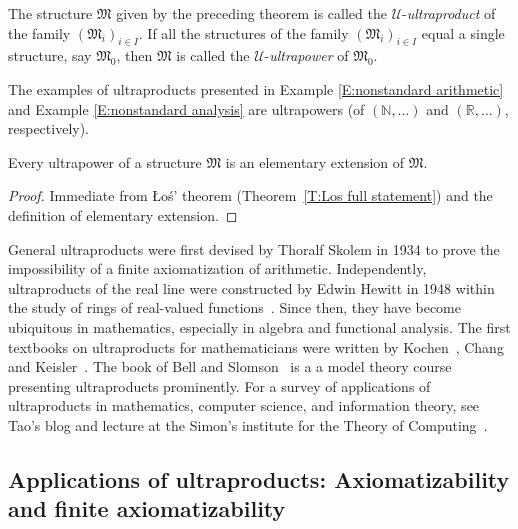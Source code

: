 \documentclass{scrartcl}
\begin{document}
\begin{definition}
The structure $\mathfrak{M}$ given by the preceding  theorem is called the $\mathscr{U}$-\emph{ultraproduct} of the family $(\mathfrak{M}_i)_{i\in I}$. If all the structures of the family $(\mathfrak{M}_i)_{i\in I}$ equal a single structure, say $\mathfrak{M}_0$, then $\mathfrak{M}$ is called the $\mathscr{U}$-\emph{ultrapower} of $\mathfrak{M}_0$.
\end{definition}

The examples of ultraproducts presented in Example \ref{E:nonstandard arithmetic} and Example \ref{E:nonstandard analysis} are ultrapowers (of $(\mathbb{N},\dots)$ and $(\mathbb{R}, \dots)$, respectively).

\begin{theorem}
Every ultrapower of a structure $\mathfrak{M}$ is an elementary extension of $\mathfrak{M}$.
\end{theorem}


\begin{proof}
Immediate from \L o\'{s}' theorem (Theorem~\ref{T:Los full statement}) and the definition of elementary extension.
\end{proof}


\begin{history}
General ultraproducts were first devised by Thoralf Skolem in 1934 \cite{Skolem:1934} to prove the impossibility of a finite axiomatization of arithmetic. Independently, ultraproducts of the real line were constructed by Edwin Hewitt in 1948 within the study of rings of real-valued functions~\cite{Hewitt:1948}. Since then, they have become ubiquitous in mathematics, especially in algebra and functional analysis. The first textbooks on ultraproducts for mathematicians were written by Kochen~\cite{Kochen:1961}, Chang~\cite{Chang:1967} and Keisler~\cite{Keisler:1967}. The book of Bell and Slomson~\cite{Bell-Slomson:1969} is a a model theory course presenting ultraproducts prominently. For a survey of applications of ultraproducts in mathematics, computer science, and information theory, see Tao's blog and lecture at the Simon's institute for the Theory of Computing~\cite{Tao:Ultraproducts}.
\end{history}



\subsection{Applications of ultraproducts: Axiomatizability and finite axiomatizability}
\end{document}
